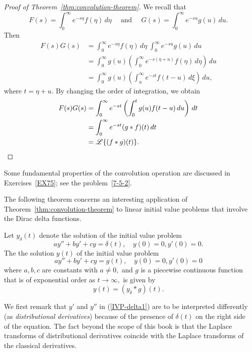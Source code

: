 \begin{proof}[Proof of Theorem~\ref{thm:convolution-theorem}]
We recall that 
\[
	F(s)  = \int_0^\infty e^{-s\eta} f(\eta) \, d\eta\quad \text{ and }\quad 
	G(s) = \int_0^\infty e^{-su} g(u) \, du.\] Then 
\begin{align*}
		F(s) G(s) & = \int_0^\infty e^{-s\eta} f(\eta) \, d\eta\; \int_0^\infty e^{-su} g(u) \, du\\
		&=\int_0^\infty g(u) \left( \int_0^\infty e^{-s(\eta+u)} f(\eta) \, d\eta \right) \, du\\
		& = \int_0^\infty g(u) \left( \int_u^\infty e^{-st} f(t - u) \, d\xi \right) \, du,
\end{align*}
where $t=\eta+u.$
By changing the order of integration, we obtain
\begin{align*} F(s) G(s)&=\int_0^\infty e^{-s t} \left( \int_0^t g(u)  f(t - u) \, du \right) \, dt \\
	&=\int_0^\infty e^{-st} (g\ast f)(t)\, dt\\
	& = \mathscr{L}\{(f\ast g)(t)\}.\qedhere
\end{align*}
\end{proof}
Some fundamental properties of the convolution operation are discussed in  Exercises~\ref{EX75}; see the problem~\ref{7-5-2}.

The following theorem concerns an interesting application of Theorem~\ref{thm:convolution-theorem} to linear initial value problems that involve the Dirac delta functions.  


\begin{theorem}\label{thm:IVP-convolution}
	Let $y_\delta(t)$ denote the solution of the initial value problem
 \begin{equation}\label{IVP-delta1}
	ay''+by'+cy = \delta(t), \quad y(0) = 0, y'(0) = 0.
\end{equation}
The the solution $y(t)$ of the initial value problem 
\begin{equation}\label{IVP-delta2}
	ay''+by'+cy = g(t), \quad y(0) = 0, y'(0) = 0
	\end{equation} where $a, b, c$ are constants with $a\ne 0,$ and $g$ is a piecewise continuous function that is of exponential order as $t\to\infty,$ is given by
	\[y(t) = (y_\delta \ast g)(t).\]
\end{theorem}

We first remark that $y'$ and $y''$ in (\ref{IVP-delta1}) are to be interpreted  differently (as \textit{distributional derivatives}) because of the presence of $\delta(t)$ on the right side of the equation. The fact beyond the scope of this book is that the Laplace transforms of  distributional derivatives coincide with the Laplace transforms of the classical derivatives.  


